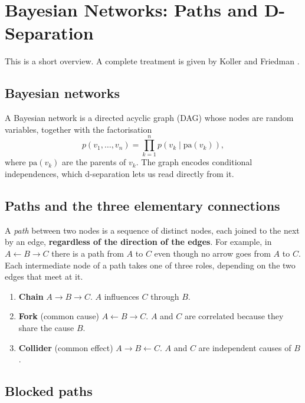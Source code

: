 \section{Bayesian Networks: Paths and D-Separation}\label{seq:d_separation}

This is a short overview. A complete treatment is given by Koller and
Friedman \cite{koller2009probabilistic}.

\subsection*{Bayesian networks}

A Bayesian network is a directed acyclic graph (DAG) whose nodes are
random variables, together with the factorisation
\[
    p(v_1, \dots, v_n) = \prod_{k=1}^n p(v_k \mid \mathrm{pa}(v_k)),
\]
where $\mathrm{pa}(v_k)$ are the parents of $v_k$. The graph encodes
conditional independences, which d-separation lets us read directly from
it.

\subsection*{Paths and the three elementary connections}

A \emph{path} between two nodes is a sequence of distinct nodes, each
joined to the next by an edge, \textbf{regardless of the direction of
the edges}. For example, in
$A \leftarrow B \rightarrow C$ there is a path from $A$ to $C$ even
though no arrow goes from $A$ to $C$. Each intermediate node of a path
takes one of three roles, depending on the two edges that meet at it.

\begin{enumerate}
    \item \textbf{Chain} $A \rightarrow B \rightarrow C$. $A$ influences
    $C$ through $B$.
    \item \textbf{Fork} (common cause) $A \leftarrow B \rightarrow C$.
    $A$ and $C$ are correlated because they share the cause $B$.
    \item \textbf{Collider} (common effect) $A \rightarrow B \leftarrow
    C$. $A$ and $C$ are independent causes of $B$.
\end{enumerate}

\subsection*{Blocked paths}

